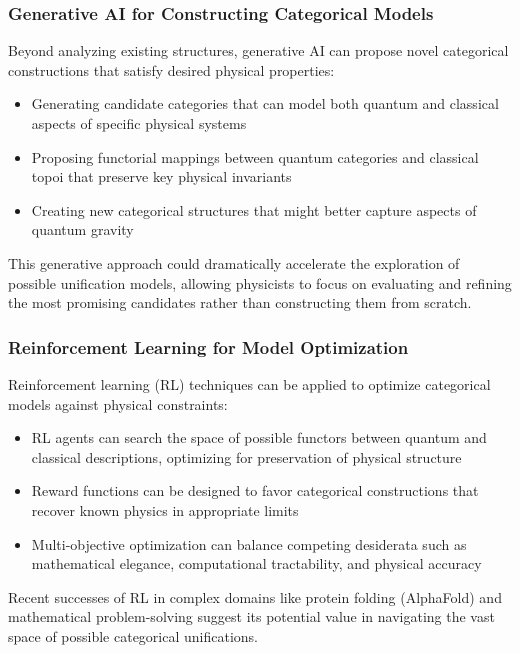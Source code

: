 \subsubsection{Generative AI for Constructing Categorical Models}

Beyond analyzing existing structures, generative AI can propose novel categorical constructions that satisfy desired physical properties:

\begin{itemize}
    \item Generating candidate categories that can model both quantum and classical aspects of specific physical systems
    \item Proposing functorial mappings between quantum categories and classical topoi that preserve key physical invariants
    \item Creating new categorical structures that might better capture aspects of quantum gravity
\end{itemize}

This generative approach could dramatically accelerate the exploration of possible unification models, allowing physicists to focus on evaluating and refining the most promising candidates rather than constructing them from scratch.

\subsubsection{Reinforcement Learning for Model Optimization}

Reinforcement learning (RL) techniques can be applied to optimize categorical models against physical constraints:

\begin{itemize}
    \item RL agents can search the space of possible functors between quantum and classical descriptions, optimizing for preservation of physical structure
    \item Reward functions can be designed to favor categorical constructions that recover known physics in appropriate limits
    \item Multi-objective optimization can balance competing desiderata such as mathematical elegance, computational tractability, and physical accuracy
\end{itemize}

Recent successes of RL in complex domains like protein folding (AlphaFold) and mathematical problem-solving suggest its potential value in navigating the vast space of possible categorical unifications.

